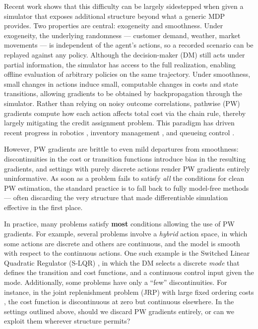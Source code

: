 \documentclass{article}
\theoremstyle{definition}
\theoremstyle{remark}
\begin{document}
Recent work shows that this difficulty can be largely sidestepped when given a simulator that exposes additional structure beyond what a generic MDP provides. Two properties are central: exogeneity and smoothness. Under exogeneity, the underlying randomness --- customer demand, weather, market movements --- is independent of the agent's actions, so a recorded scenario can be replayed against any policy. Although the decision-maker (DM) still acts under partial information, the simulator has access to the full realization, enabling offline evaluation of arbitrary policies on the same trajectory. Under smoothness, small changes in actions induce small, computable changes in costs and state transitions, allowing gradients to be obtained by backpropagation through the simulator. Rather than relying on noisy outcome correlations, pathwise (PW) gradients compute how each action affects total cost via the chain rule, thereby largely mitigating the credit assignment problem. This paradigm has driven recent progress in robotics \citep{hu2019difftaichi,levine2016end}, inventory management \citep{alvo2023deep,madeka2022deep}, and queueing control \citep{che2024differentiable}.

However, PW gradients are brittle to even mild departures from smoothness: discontinuities in the cost or transition functions introduce bias in the resulting gradients, and settings with purely discrete actions render PW gradients entirely uninformative. As soon as a problem fails to satisfy \textit{all} the conditions for clean PW estimation, the standard practice is to fall back to fully model-free methods — often discarding the very structure that made differentiable simulation effective in the first place.

In practice, many problems satisfy \textbf{most} conditions allowing the use of PW gradients. For example, several problems involve a \textit{hybrid} action space, in which some actions are discrete and others are continuous, and the model is smooth with respect to the continuous actions. One such example is the Switched Linear Quadratic Regulator (S-LQR) \citep{zhang2009value}, in which the DM selects a discrete \textit{mode} that defines the transition and cost functions, and a continuous control input given the mode. Additionally, some problems have only a ``few'' discontinuities. For instance, in the joint replenishment problem (JRP) with large fixed ordering costs \citep{goyal1989joint}, the cost function is discontinuous at zero but continuous elsewhere. In the settings outlined above, should we discard PW gradients entirely, or can we exploit them wherever structure permits?
\end{document}
